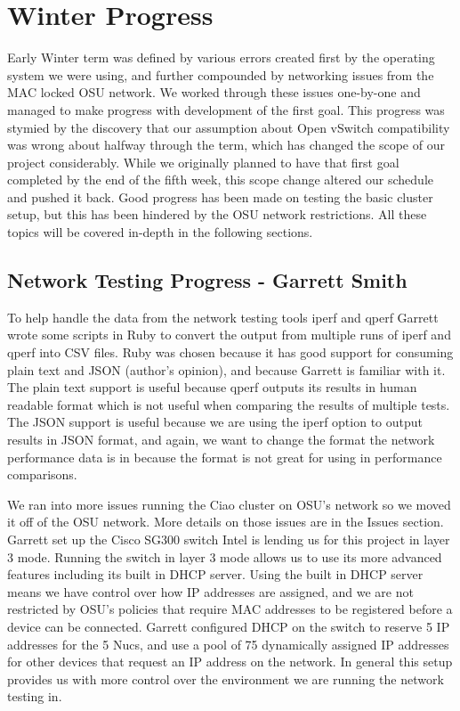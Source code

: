 \documentclass[10pt,onecolumn,journal,draftclsnofoot]{IEEEtran}
\begin{document}
\section{Winter Progress}
Early Winter term was defined by various errors created first by the operating
system we were using, and further compounded by networking issues from the MAC
locked OSU network. We worked through these issues one-by-one and managed to
make progress with development of the first goal. This progress was stymied by
the discovery that our assumption about Open vSwitch compatibility was wrong
about halfway through the term, which has changed the scope of our project
considerably. While we originally planned to have that first goal completed by
the end of the fifth week, this scope change altered our schedule and pushed it
back. Good progress has been made on testing the basic cluster setup, but this
has been hindered by the OSU network restrictions. All these topics will be
covered in-depth in the following sections.

\subsection{Network Testing Progress - Garrett Smith}
To help handle the data from the network testing tools iperf and qperf Garrett
wrote some scripts in Ruby to convert the output from multiple runs of iperf and
qperf into CSV files. Ruby was chosen because it has good support for consuming
plain text and JSON (author's opinion), and because Garrett is familiar with it.
The plain text support is useful because qperf outputs its results in human
readable format which is not useful when comparing the results of multiple
tests.  The JSON support is useful because we are using the iperf option to
output results in JSON format, and again, we want to change the format the
network performance data is in because the format is not great for using in
performance comparisons.

We ran into more issues running the Ciao cluster on OSU's network so we moved it
off of the OSU network. More details on those issues are in the Issues section.
Garrett set up the Cisco SG300 switch Intel is lending us for this project in
layer 3 mode. Running the switch in layer 3 mode allows us to use its more
advanced features including its built in DHCP server. Using the built in DHCP
server means we have control over how IP addresses are assigned, and we are not
restricted by OSU's policies that require MAC addresses to be registered before
a device can be connected.
Garrett configured DHCP on the switch to reserve 5 IP addresses for the
5 Nucs, and use a pool of 75 dynamically assigned IP addresses for other
devices that request an IP address on the network. In general this setup
provides us with more control over the environment we are running the network
testing in.
\end{document}
